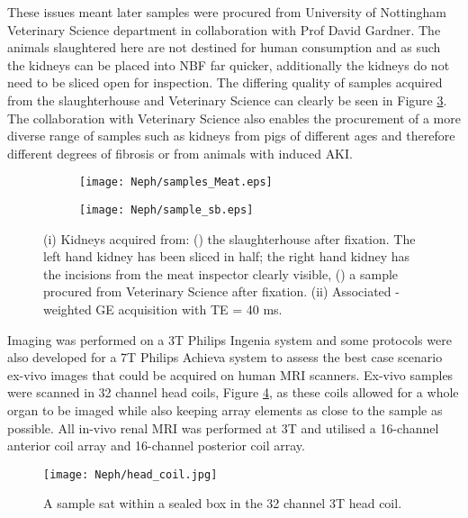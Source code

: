 These issues meant later samples were procured from University of Nottingham Veterinary Science department in collaboration with Prof David Gardner. The animals slaughtered here are not destined for human consumption and as such the kidneys can be placed into \ac{NBF} far quicker, additionally the kidneys do not need to be sliced open for inspection. The differing quality of samples acquired from the slaughterhouse and Veterinary Science can clearly be seen in Figure \ref{fig:ex_samples}. The collaboration with Veterinary Science also enables the procurement of a more diverse range of samples such as kidneys from pigs of different ages and therefore different degrees of fibrosis or from animals with induced \ac{AKI}.  

\begin{figure}[H]
	\centering
	\begin{subfigure}[c]{0.47\textwidth}
		\centering
		\texttt{[image: Neph/samples\_Meat.eps]}
		\caption{}
		\label{fig:ex_samples_meat}
	\end{subfigure}
	\hfill
	\begin{subfigure}[c]{0.47\textwidth}
		\centering
		\texttt{[image: Neph/sample\_sb.eps]}
		\caption{}
		\label{fig:ex_samples_sb}
	\end{subfigure}
	\caption{(i) Kidneys acquired from: () the slaughterhouse after fixation. The left hand kidney has been sliced in half; the right hand kidney has the incisions from the meat inspector clearly visible, () a sample procured from Veterinary Science after fixation. (ii) Associated \ttwo-weighted \ac*{GE} acquisition with TE = 40 ms.}
	\label{fig:ex_samples}
\end{figure}

Imaging was performed on a 3T Philips Ingenia system and some protocols were also developed for a 7T Philips Achieva system to assess the best case scenario ex-vivo images that could be acquired on human \ac{MRI} scanners. Ex-vivo samples were scanned in 32 channel head coils, Figure \ref{fig:ex_head_coil}, as these coils allowed for a whole organ to be imaged while also keeping array elements as close to the sample as possible. All in-vivo renal \ac{MRI} was performed at 3T and utilised a 16-channel anterior coil array and 16-channel posterior coil array.

\begin{figure}[H]
	\centering
	\texttt{[image: Neph/head\_coil.jpg]}
	\caption{A sample sat within a sealed box in the 32 channel 3T head coil.}
	\label{fig:ex_head_coil}	
\end{figure}

